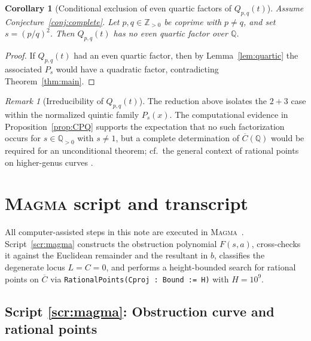 \documentclass[12pt]{article}
\newtheorem{corollary}{Corollary}
\theoremstyle{remark}
\newtheorem{remark}{Remark}
\theoremstyle{definition}
\begin{document}
\begin{corollary}[Conditional exclusion of even quartic factors of $Q_{p,q}(t)$]\label{cor:quartic}
Assume Conjecture~\ref{conj:complete}.
Let $p,q\in\mathbb{Z}_{>0}$ be coprime with $p\neq q$, and set $s=(p/q)^{2}$.
Then $Q_{p,q}(t)$ has no even quartic factor over $\mathbb{Q}$.
\end{corollary}

\begin{proof}
If $Q_{p,q}(t)$ had an even quartic factor, then by Lemma~\ref{lem:quartic} the associated $P_s$ would have a quadratic factor, contradicting Theorem~\ref{thm:main}.
\end{proof}

\begin{remark}[Irreducibility of $Q_{p,q}(t)$]\label{rem:irred}
The reduction above isolates the $2+3$ case within the normalized quintic family $P_s(x)$.
The computational evidence in Proposition~\ref{prop:CPQ} supports the expectation that no such factorization occurs for $s\in\mathbb{Q}_{>0}$ with $s\neq 1$, but a complete determination of $\overline{C}(\mathbb{Q})$ would be required for an unconditional theorem; cf.\ the general context of rational points on higher-genus curves \cite{Faltings1983,Chabauty1941,Coleman1985,Stoll2006}.
\end{remark}


\appendix
\section{\textsc{Magma} script and transcript}\label{app:scripts}

\noindent
All computer-assisted steps in this note are executed in \textsc{Magma}~\cite{Magma}.
Script~\ref{scr:magma} constructs the obstruction polynomial $F(s,a)$, cross-checks it against the Euclidean remainder and the resultant in $b$, classifies the degenerate locus $L=C=0$, and performs a height-bounded search for rational points on $\overline{C}$ via \texttt{RationalPoints(Cproj : Bound := H)} with $H=10^{9}$.

\subsection*{Script \ref{scr:magma}: Obstruction curve and rational points}
\label{scr:magma}
\end{document}
